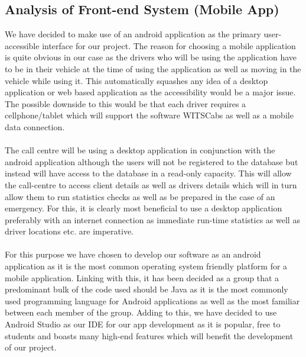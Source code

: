 \documentclass[a4paper,12pt]{article}
\begin{document}
\subsection{Analysis of Front-end System (Mobile App)}
We have decided to make use of an android application as the primary user-accessible interface for our project. The reason for choosing a mobile application is quite obvious in our case as the drivers who will be using the application have to be in their vehicle at the time of using the application as well as moving in the vehicle while using it. This automatically squashes any idea of a desktop application or web based application as the accessibility would be a major issue. The possible downside to this would be that each driver requires a cellphone/tablet which will support the software WITSCabs as well as a mobile data connection. \\\\
The call centre will be using a desktop application in conjunction with the android application although the users will not be registered to the database but instead will have access to the database in a read-only capacity. This will allow the call-centre to access client details as well as drivers details which will in turn allow them to run statistics checks as well as be prepared in the case of an emergency. For this, it is clearly most beneficial to use a desktop application preferably with an internet connection as immediate run-time statistics as well as driver locations etc. are imperative.\\\\
For this purpose we have chosen to develop our software as an android application as it is the most common operating system friendly platform for a mobile application. Linking with this, it has been decided as a group that a predominant bulk of the code used should be Java as it is the most commonly used programming language for Android applications as well as the most familiar between each member of the group. Adding to this, we have decided to use Android Studio as our IDE for our app development as it is popular, free to students and boasts many high-end features which will benefit the development of our project.
\newpage
\end{document}
